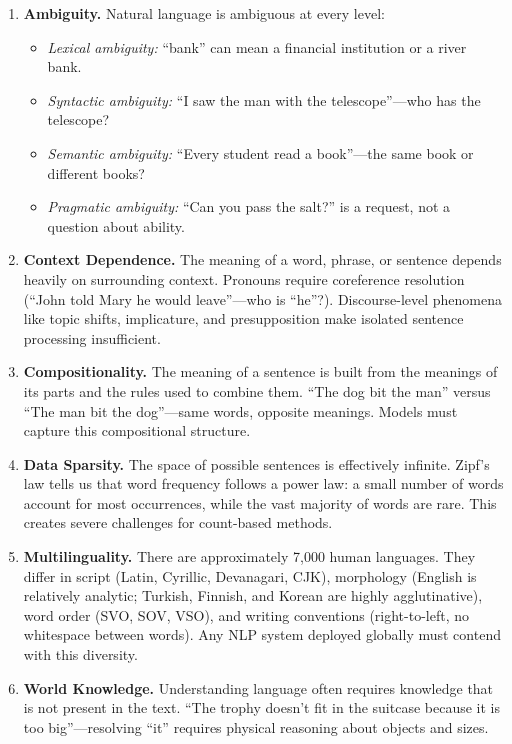 \begin{enumerate}[label=\textbf{\arabic*.}]
    \item \textbf{Ambiguity.} Natural language is ambiguous at every level:
    \begin{itemize}
        \item \emph{Lexical ambiguity:} ``bank'' can mean a financial institution or a river
              bank.
        \item \emph{Syntactic ambiguity:} ``I saw the man with the telescope''---who has the
              telescope?
        \item \emph{Semantic ambiguity:} ``Every student read a book''---the same book or
              different books?
        \item \emph{Pragmatic ambiguity:} ``Can you pass the salt?'' is a request, not a
              question about ability.
    \end{itemize}

    \item \textbf{Context Dependence.} The meaning of a word, phrase, or sentence depends
    heavily on surrounding context. Pronouns require coreference resolution (``John told
    Mary he would leave''---who is ``he''?). Discourse-level phenomena like topic shifts,
    implicature, and presupposition make isolated sentence processing insufficient.

    \item \textbf{Compositionality.} The meaning of a sentence is built from the meanings of
    its parts and the rules used to combine them. ``The dog bit the man'' versus ``The man
    bit the dog''---same words, opposite meanings. Models must capture this compositional
    structure.

    \item \textbf{Data Sparsity.} The space of possible sentences is effectively infinite.
    Zipf's law tells us that word frequency follows a power law: a small number of words
    account for most occurrences, while the vast majority of words are rare. This creates
    severe challenges for count-based methods.

    \item \textbf{Multilinguality.} There are approximately 7,000 human languages. They
    differ in script (Latin, Cyrillic, Devanagari, CJK), morphology (English is
    relatively analytic; Turkish, Finnish, and Korean are highly agglutinative), word
    order (SVO, SOV, VSO), and writing conventions (right-to-left, no whitespace
    between words). Any NLP system deployed globally must contend with this diversity.

    \item \textbf{World Knowledge.} Understanding language often requires knowledge that is
    not present in the text. ``The trophy doesn't fit in the suitcase because it is too
    big''---resolving ``it'' requires physical reasoning about objects and sizes.
\end{enumerate}

